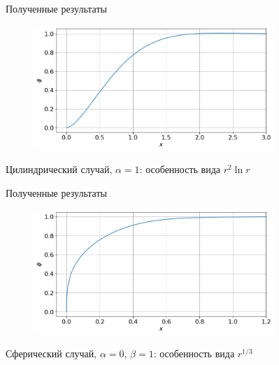 \begin{frame}{Полученные результаты}
\vspace{-0.6cm}
\begin{figure}
	\includegraphics[width=0.81\textwidth]{figures/result_volumes_cyl_bi.png}
\end{figure}
\vspace{-0.7cm}
\begin{center}
	Цилиндрический случай, $\alpha = 1$: особенность вида $r^2 \ln r$
\end{center}
\end{frame}


\begin{frame}{Полученные результаты}
\vspace{-0.6cm}
\begin{figure}
	\includegraphics[width=0.81\textwidth]{figures/result_volumes_sph_p.png}
\end{figure}
\vspace{-0.7cm}
\begin{center}
	Сферический случай, $\alpha = 0$, $\beta = 1$: особенность вида $r^{1/3}$
\end{center}
\end{frame}